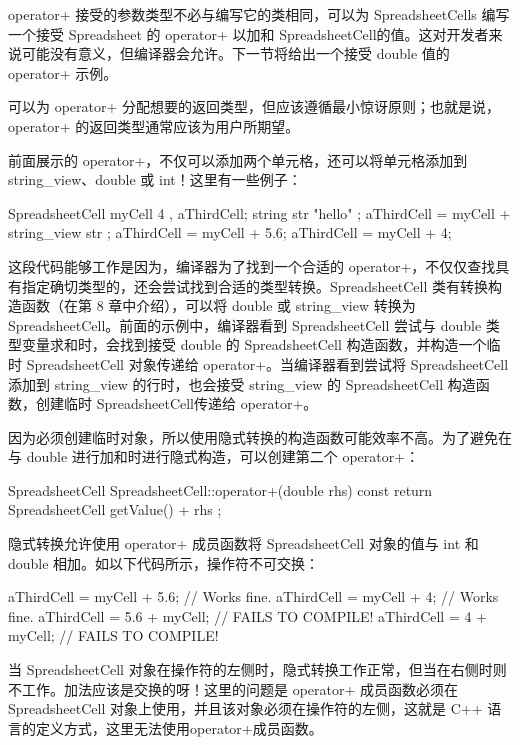 operator+ 接受的参数类型不必与编写它的类相同，可以为 SpreadsheetCells 编写一个接受 Spreadsheet 的 operator+ 以加和 SpreadsheetCell的值。这对开发者来说可能没有意义，但编译器会允许。下一节将给出一个接受 double 值的 operator+ 示例。

可以为 operator+ 分配想要的返回类型，但应该遵循最小惊讶原则；也就是说，operator+ 的返回类型通常应该为用户所期望。


前面展示的 operator+，不仅可以添加两个单元格，还可以将单元格添加到 string\_view、double 或 int！这里有一些例子：

\begin{cpp}
SpreadsheetCell myCell { 4 }, aThirdCell;
string str { "hello" };
aThirdCell = myCell + string_view{ str };
aThirdCell = myCell + 5.6;
aThirdCell = myCell + 4;
\end{cpp}

这段代码能够工作是因为，编译器为了找到一个合适的 operator+，不仅仅查找具有指定确切类型的，还会尝试找到合适的类型转换。SpreadsheetCell 类有转换构造函数（在第 8 章中介绍），可以将 double 或 string\_view 转换为 SpreadsheetCell。前面的示例中，编译器看到 SpreadsheetCell 尝试与 double 类型变量求和时，会找到接受 double 的 SpreadsheetCell 构造函数，并构造一个临时 SpreadsheetCell 对象传递给 operator+。当编译器看到尝试将 SpreadsheetCell 添加到 string\_view 的行时，也会接受 string\_view 的 SpreadsheetCell 构造函数，创建临时 SpreadsheetCell传递给 operator+。

因为必须创建临时对象，所以使用隐式转换的构造函数可能效率不高。为了避免在与 double 进行加和时进行隐式构造，可以创建第二个 operator+：

\begin{cpp}
SpreadsheetCell SpreadsheetCell::operator+(double rhs) const
{
    return SpreadsheetCell { getValue() + rhs };
}
\end{cpp}


隐式转换允许使用 operator+ 成员函数将 SpreadsheetCell 对象的值与 int 和 double 相加。如以下代码所示，操作符不可交换：

\begin{cpp}
aThirdCell = myCell + 5.6; // Works fine.
aThirdCell = myCell + 4; // Works fine.
aThirdCell = 5.6 + myCell; // FAILS TO COMPILE!
aThirdCell = 4 + myCell; // FAILS TO COMPILE!
\end{cpp}

当 SpreadsheetCell 对象在操作符的左侧时，隐式转换工作正常，但当在右侧时则不工作。加法应该是交换的呀！这里的问题是 operator+ 成员函数必须在 SpreadsheetCell 对象上使用，并且该对象必须在操作符的左侧，这就是 C++ 语言的定义方式，这里无法使用operator+成员函数。

